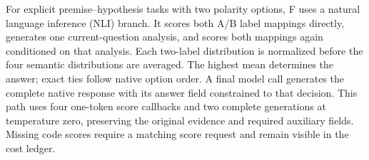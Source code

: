 For explicit premise--hypothesis tasks with two polarity options, F uses a natural language inference (NLI) branch. It scores both A/B label mappings directly, generates one current-question analysis, and scores both mappings again conditioned on that analysis. Each two-label distribution is normalized before the four semantic distributions are averaged. The highest mean determines the answer; exact ties follow native option order. A final model call generates the complete native response with its answer field constrained to that decision. This path uses four one-token score callbacks and two complete generations at temperature zero, preserving the original evidence and required auxiliary fields. Missing code scores require a matching score request and remain visible in the cost ledger.
